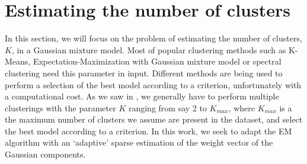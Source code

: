 \section{Estimating the number of clusters}
\label{estim_nb_clusters_sect}

In this section, we will focus on the problem of estimating the number of clusters, $K$, in a Gaussian mixture model. Most of popular clustering methods such as K-Means, Expectation-Maximization with Gaussian mixture model or spectral clustering need this parameter in input. Different methods are being used to perform a selection of the best model according to a criterion, unfortunately with a computational cost. As we saw in , we generally have to perform multiple clusterings with the parameter $K$ ranging from say 2 to $K_{max}$, where $K_{max}$ is a the maximum number of clusters we assume are present in the dataset, and select the best model according to a criterion. In this work, we seek to adapt the EM algorithm with an `adaptive' sparse estimation of the weight vector of the Gaussian components.

